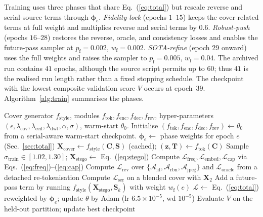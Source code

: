 \documentclass[runningheads]{llncs}
\begin{document}
Training uses three phases that share Eq.~(\ref{eq:total}) but rescale reverse and serial-source terms through $\boldsymbol{\phi}_{e}$. \emph{Fidelity-lock} (epochs $1$--$15$) keeps the cover-related terms at full weight and multiplies reverse and serial terms by $0.6$. \emph{Robust-push} (epochs $16$--$28$) restores the reverse, oracle, and consistency losses and enables the future-pass sampler at $p_{\text{f}}=0.002$, $w_{\text{f}}=0.002$. \emph{SOTA-refine} (epoch $29$ onward) uses the full weights and raises the sampler to $p_{\text{f}}=0.005$, $w_{\text{f}}=0.04$. The archived run contains $41$ epochs, although the source script permits up to $60$; thus $41$ is the realised run length rather than a fixed stopping schedule. The checkpoint with the lowest composite validation score $V$ occurs at epoch~$39$. Algorithm~\ref{alg:train} summarises the phases.

\begin{algorithm}[t]
\caption{Frequency-guided semantic steganography training.}
\label{alg:train}
\small
\begin{algorithmic}[1]
\Require Cover generator $f_{\text{style}}$, modules $f_{\text{tok}}, f_{\text{enc}}, f_{\text{dec}}, f_{\text{rev}}$, hyper-parameters $(\epsilon, \lambda_{\text{cov}}, \lambda_{\text{ceil}}, \lambda_{\text{dwt}}, \alpha,\sigma)$, warm-start $\theta_{0}$.
\State Initialise $(f_{\text{tok}}, f_{\text{enc}}, f_{\text{dec}}, f_{\text{rev}})\leftarrow\theta_{0}$ from a serial-aware warm-start checkpoint.
    \State $\boldsymbol{\phi}_{e}\gets$ phase weights for epoch $e$ (Sec.~\ref{sec:total})
        \State $\mathbf{X}_{\text{cover}}\gets f_{\text{style}}(\mathbf{C},\mathbf{S})$ (cached); $(\mathbf{z},\mathbf{T})\gets f_{\text{tok}}(\mathbf{C})$
        \State Sample $\sigma_{\text{train}}\!\in\![1.02,1.30]$; $\mathbf{X}_{\text{stego}}\gets$ Eq.~(\ref{eq:stego})
        \State Compute $\mathcal{L}_{\text{freq}}, \mathcal{L}_{\text{embed}}, \mathcal{L}_{\text{cap}}$ via Eqs.~(\ref{eq:freq})--(\ref{eq:cap})
        \State Compute $\mathcal{L}_{\text{rev}}$ over $\{\mathcal{A}_{\text{id}},\mathcal{A}_{\text{rbn}},\mathcal{A}_{\text{jpeg}}\}$ and $\mathcal{L}_{\text{oracle}}$ from a detached re-tokenisation
        \State Compute $\mathcal{L}_{\text{ser}}$ on a blended cover with $\mathbf{X}_{2}$
            \State Add a future-pass term by running $f_{\text{style}}(\mathbf{X}_{\text{stego}}, \mathbf{S}_{k})$ with weight $w_{\text{f}}(e)$
        \EndIf
        \State $\mathcal{L}\gets$ Eq.~(\ref{eq:total}) reweighted by $\boldsymbol{\phi}_{e}$; update $\theta$ by Adam (lr $6.5\!\times\!10^{-5}$, wd $10^{-5}$)
    \EndFor
    \State Evaluate $V$ on the held-out partition; update best checkpoint
\EndFor
\end{algorithmic}
\end{algorithm}
\end{document}
